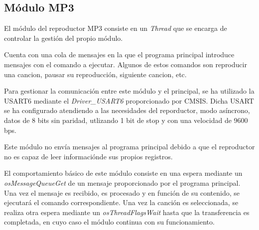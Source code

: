 \subsection{Módulo MP3}
El módulo del reproductor MP3 consiste en un \textit{Thread} que se encarga de controlar la gestión del propio módulo.

Cuenta con una cola de mensajes en la que el programa principal introduce mensajes con el comando a ejecutar. Algunos de estos comandos son reproducir una cancion, pausar su reproducción, siguiente cancion, etc.

Para gestionar la comunicación entre este módulo y el principal, se ha utilizado la USART6 mediante el \textit{Driver\_USART6} proporcionado por CMSIS. Dicha USART se ha configurado atendiendo a las necesidades del reporductor, modo asíncrono, datos de 8 bits sin paridad, utlizando 1 bit de stop y con una velocidad de 9600 bps.

Este módulo no envía mensajes al programa principal debido a que el reproductor no es capaz de leer informaciónde sus propios registros.

El comportamiento básico de este módulo consiste en una espera mediante un \textit{osMessageQueueGet} de un mensaje proporcionado por el programa principal. Una vez el mensaje es recibido, es procesado y en función de su contenido, se ejecutará el comando correspondiente. Una vez la canción es seleccionada, se realiza otra espera mediante un \textit{osThreadFlagsWait} hasta que la transferencia es completada, en cuyo caso el módulo continua con su funcionamiento.